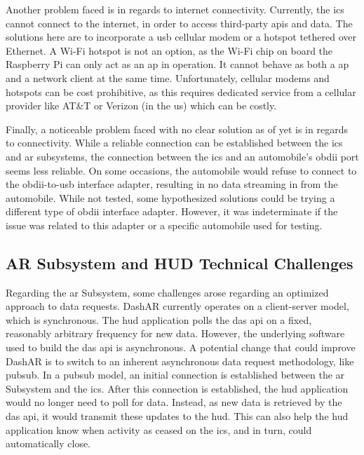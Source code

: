         \par Another problem faced is in regards to internet connectivity. Currently, the \gls{ics} cannot connect to the internet, in order to access third-party \glspl{api} and data. The solutions here are to incorporate a \gls{usb} cellular modem or a hotspot tethered over Ethernet. A Wi-Fi hotspot is not an option, as the Wi-Fi chip on board the Raspberry Pi can only act as an \gls{ap} in operation. It cannot behave as both a \gls{ap} and a network client at the same time. Unfortunately, cellular modems and hotspots can be cost prohibitive, as this requires dedicated service from a cellular provider like AT\&T or Verizon (in the \gls{us}) which can be costly.

        \par Finally, a noticeable problem faced with no clear solution as of yet is in regards to connectivity. While a reliable connection can be established between the \gls{ics} and \gls{ar} subsystems, the connection between the \gls{ics} and an automobile's \gls{obdii} port seems less reliable. On some occasions, the automobile would refuse to connect to the \gls{obdii}-to-\gls{usb} interface adapter, resulting in no data streaming in from the automobile. While not tested, some hypothesized solutions could be trying a different type of \gls{obdii} interface adapter. However, it was indeterminate if the issue was related to this adapter or a specific automobile used for testing.


    \subsection{AR Subsystem and HUD Technical Challenges}
        \par Regarding the \gls{ar} Subsystem, some challenges arose regarding an optimized approach to data requests. DashAR currently operates on a client-server model, which is synchronous. The \gls{hud} application polls the \gls{das} \gls{api} on a fixed, reasonably arbitrary frequency for new data. However, the underlying software used to build the \gls{das} \gls{api} is asynchronous. A potential change that could improve DashAR is to switch to an inherent asynchronous data request methodology, like \gls{pubsub}. In a \gls{pubsub} model, an initial connection is established between the \gls{ar} Subsystem and the \gls{ics}. After this connection is established, the \gls{hud} application would no longer need to poll for data. Instead, as new data is retrieved by the \gls{das} \gls{api}, it would transmit these updates to the \gls{hud}. This can also help the \gls{hud} application know when activity as ceased on the \gls{ics}, and in turn, could automatically close.

